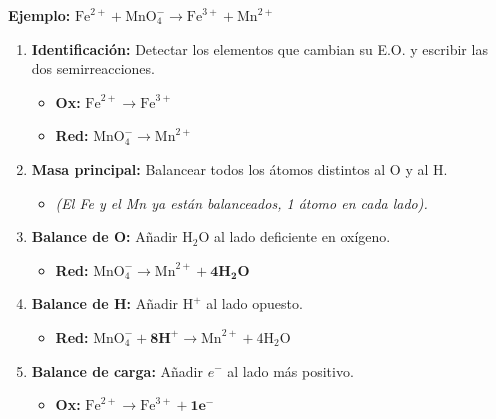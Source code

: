 \documentclass[letterpaper, 12pt, twoside]{article}
\newenvironment{formulabox}[1]{%
    \begin{tcolorbox}[colback=rojoSuave, colframe=rojoFuerte,
        title=\textbf{#1}, fonttitle=\bfseries]
}{%
    \end{tcolorbox}
}
\begin{document}
\begin{formulabox}{Pasos — Medio Ácido}
\textbf{Ejemplo:} $\text{Fe}^{2+} + \text{MnO}_4^- \rightarrow \text{Fe}^{3+} + \text{Mn}^{2+}$

\begin{enumerate}[leftmargin=15pt, itemsep=0.3em]
\vspace{0.2cm}
    \item \textbf{Identificación:} Detectar los elementos que cambian su E.O. y escribir las dos semirreacciones.
    \begin{itemize}[leftmargin=15pt, topsep=2pt, itemsep=0pt]
        \item \textbf{Ox:} $\text{Fe}^{2+} \rightarrow \text{Fe}^{3+}$
        \item \textbf{Red:} $\text{MnO}_4^- \rightarrow \text{Mn}^{2+}$
    \end{itemize}
    \vspace{0.2cm}
    \item \textbf{Masa principal:} Balancear todos los átomos distintos al O y al H.
    \begin{itemize}[leftmargin=15pt, topsep=2pt, itemsep=0pt]
        \item \textit{(El Fe y el Mn ya están balanceados, 1 átomo en cada lado).}
    \end{itemize}
    \vspace{0.2cm}
    \item \textbf{Balance de O:} Añadir $\text{H}_2\text{O}$ al lado deficiente en oxígeno.
    \begin{itemize}[leftmargin=15pt, topsep=2pt, itemsep=0pt]
        \item \textbf{Red:} $\text{MnO}_4^- \rightarrow \text{Mn}^{2+} + \mathbf{4H_2O}$
    \end{itemize}
    \vspace{0.2cm}
    \item \textbf{Balance de H:} Añadir $\text{H}^+$ al lado opuesto.
    \begin{itemize}[leftmargin=15pt, topsep=2pt, itemsep=0pt]
        \item \textbf{Red:} $\text{MnO}_4^- + \mathbf{8H^+} \rightarrow \text{Mn}^{2+} + 4\text{H}_2\text{O}$
    \end{itemize}
    \vspace{0.2cm}
    \item \textbf{Balance de carga:} Añadir $e^-$ al lado más positivo.
    \begin{itemize}[leftmargin=15pt, topsep=2pt, itemsep=0pt]
        \item \textbf{Ox:} $\text{Fe}^{2+} \rightarrow \text{Fe}^{3+} + \mathbf{1e^-}$

\end{itemize}
\end{enumerate}
\end{formulabox}
\end{document}
